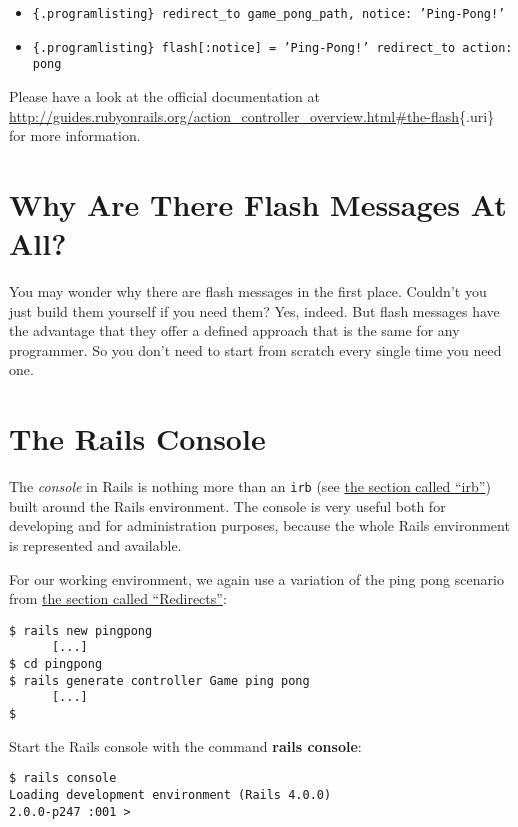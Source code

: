 \documentclass[a4paper]{book}
\begin{document}
\begin{itemize}
\item
  \texttt{\{.programlisting\}     redirect\_to game\_pong\_path, notice: 'Ping-Pong!'}
\item
  \texttt{\{.programlisting\}     flash{[}:notice{]} = 'Ping-Pong!'     redirect\_to action: pong}
\end{itemize}

Please have a look at the official documentation at \url{http://guides.rubyonrails.org/action_controller_overview.html\#the-flash}\{.uri\} for more information.

\section{Why Are There Flash Messages At All?}\label{why-are-there-flash-messages-at-all}

You may wonder why there are flash messages in the first place. Couldn't you just build them yourself if you need them? Yes, indeed. But flash messages have the advantage that they offer a defined approach that is the same for any programmer. So you don't need to start from scratch every single time you need one.

\section{The Rails Console}\label{the-rails-console}

The \emph{console} in Rails is nothing more than an \texttt{irb} (see \hyperref[irb]{the section called “irb”}) built around the Rails environment. The console is very useful both for developing and for administration purposes, because the whole Rails environment is represented and available.

For our working environment, we again use a variation of the ping pong scenario from \hyperref[redirects]{the section called “Redirects”}:

\begin{shaded}\begin{verbatim}
$ rails new pingpong
      [...]
$ cd pingpong
$ rails generate controller Game ping pong
      [...]
$
\end{verbatim}\end{shaded}

Start the Rails console with the command \textbf{rails console}:

\begin{shaded}\begin{verbatim}
$ rails console
Loading development environment (Rails 4.0.0)
2.0.0-p247 :001 >
\end{verbatim}\end{shaded}
\end{document}
